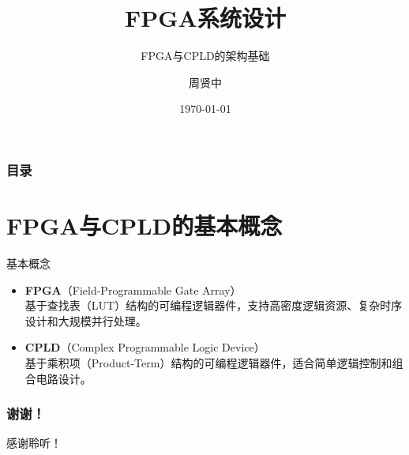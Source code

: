 \documentclass{beamer}
\title{FPGA系统设计}
\subtitle{FPGA与CPLD的架构基础}
\author{周贤中}
\institute{广东工业大学集成电路学院}
\date{\today}
\begin{document}
\begin{frame}
\titlepage
\end{frame}

\begin{frame}
\frametitle{目录}
\tableofcontents
\end{frame}

\section{FPGA与CPLD的基本概念}

\begin{frame}{基本概念}
\label{ux57faux672cux6982ux5ff5}
\begin{itemize}
\item
    \textbf{FPGA}（Field-Programmable Gate Array）\\
    基于查找表（LUT）结构的可编程逻辑器件，支持高密度逻辑资源、复杂时序设计和大规模并行处理。
\item
    \textbf{CPLD}（Complex Programmable Logic Device）\\
    基于乘积项（Product-Term）结构的可编程逻辑器件，适合简单逻辑控制和组合电路设计。
\end{itemize}
\end{frame}

% 
% 
% 



\begin{frame}
\centering
\frametitle{谢谢！}
感谢聆听！
\end{frame}
\end{document}
